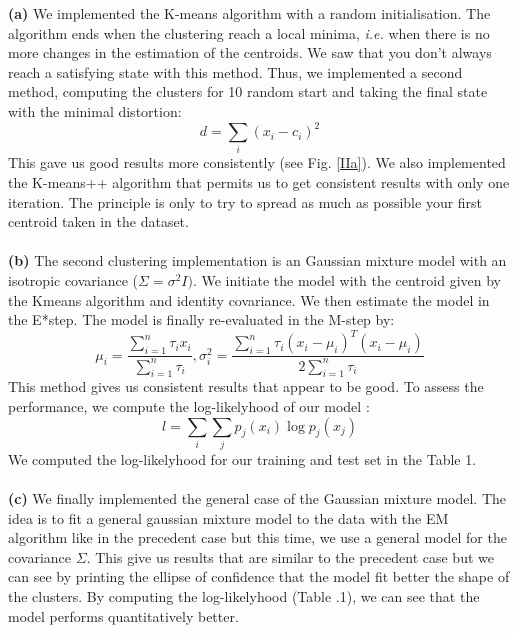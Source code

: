 \documentclass[10pt]{article}
\begin{document}
\textbf{(a)} We implemented the K-means algorithm with a random initialisation. The algorithm ends when the clustering reach a local minima, \emph{i.e.} when there is no more changes in the estimation of the centroids. We saw that you don't always reach a satisfying state with this method. Thus, we implemented a second method, computing the clusters for 10 random start and taking the final state with the minimal distortion:
\begin{equation*}
d = \sum_i (x_i - c_i)^2
\end{equation*}
This gave us good results more consistently (see Fig. \ref{IIa}). We also implemented the K-means++ algorithm that permits us to get consistent results with only one iteration. The principle is only to try to spread as much as possible your first centroid taken in the dataset.
\\\\

\textbf{(b)} The second clustering implementation is an Gaussian mixture model with an isotropic covariance ($\Sigma = \sigma^2 I)$. We initiate the model with the centroid given by the Kmeans algorithm and identity covariance. We then estimate the model in the E*step.  The model is finally re-evaluated in the M-step by: 
\begin{equation*}
\mu_i = \frac{\sum_{i=1}^{n} \tau_i x_i}{\sum_{i=1}^{n} \tau_i}, 
\sigma_i^2 = \frac{ \sum_{i=1}^{n} \tau_i (x_i - \mu_i)^T(x_i - \mu_i)}{2 \sum_{i=1}^{n} \tau_i}
\end{equation*}
This method gives us consistent results that appear to be good. To assess the performance, we compute the log-likelyhood of our model :
\begin{equation*}
l = \sum_i \sum_j p_j(x_i) \log p_j(x_j)
\end{equation*}
We computed the log-likelyhood for our training and test set in the Table 1.
\\\\

\textbf{(c)} We finally implemented the general case of the Gaussian mixture model. The idea is to fit a general gaussian mixture model to the data with the EM algorithm like in the precedent case but this time, we use a general model for the covariance $\Sigma$. This give us results that are similar to the precedent case but we can see by printing the ellipse of confidence that the model fit better the shape of the clusters. By computing the log-likelyhood (Table .1), we can see that the model performs quantitatively better.\\\\
\end{document}
